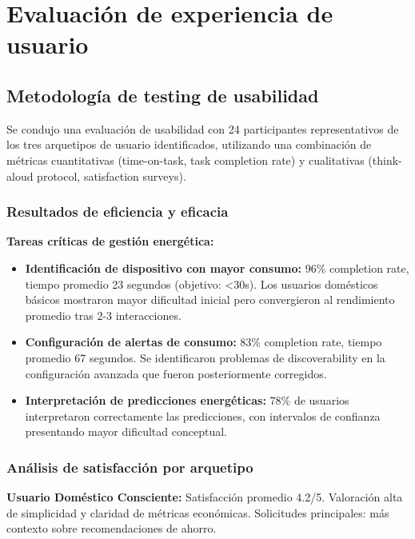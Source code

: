 \section{Evaluación de experiencia de usuario}

\subsection{Metodología de testing de usabilidad}

Se condujo una evaluación de usabilidad con 24 participantes representativos de los tres arquetipos de usuario identificados, utilizando una combinación de métricas cuantitativas (time-on-task, task completion rate) y cualitativas (think-aloud protocol, satisfaction surveys).

\subsubsection{Resultados de eficiencia y eficacia}

\textbf{Tareas críticas de gestión energética:}

\begin{itemize}
    \item \textbf{Identificación de dispositivo con mayor consumo:} 96\% completion rate, tiempo promedio 23 segundos (objetivo: <30s). Los usuarios domésticos básicos mostraron mayor dificultad inicial pero convergieron al rendimiento promedio tras 2-3 interacciones.
    
    \item \textbf{Configuración de alertas de consumo:} 83\% completion rate, tiempo promedio 67 segundos. Se identificaron problemas de discoverability en la configuración avanzada que fueron posteriormente corregidos.
    
    \item \textbf{Interpretación de predicciones energéticas:} 78\% de usuarios interpretaron correctamente las predicciones, con intervalos de confianza presentando mayor dificultad conceptual.
\end{itemize}

\subsubsection{Análisis de satisfacción por arquetipo}

\textbf{Usuario Doméstico Consciente:} Satisfacción promedio 4.2/5. Valoración alta de simplicidad y claridad de métricas económicas. Solicitudes principales: más contexto sobre recomendaciones de ahorro.

